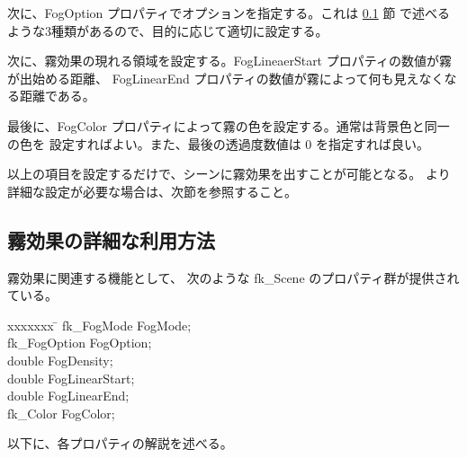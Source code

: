 次に、FogOption プロパティでオプションを指定する。これは \ref{sec:scenefogref} 節
で述べるような3種類があるので、目的に応じて適切に設定する。

次に、霧効果の現れる領域を設定する。FogLineaerStart プロパティの数値が霧が出始める距離、
FogLinearEnd プロパティの数値が霧によって何も見えなくなる距離である。

最後に、FogColor プロパティによって霧の色を設定する。通常は背景色と同一の色を
設定すればよい。また、最後の透過度数値は 0 を指定すれば良い。

以上の項目を設定するだけで、シーンに霧効果を出すことが可能となる。
より詳細な設定が必要な場合は、次節を参照すること。
\subsection{霧効果の詳細な利用方法} \label{sec:scenefogref}
霧効果に関連する機能として、
次のような fk\_Scene のプロパティ群が提供されている。
\begin{bf}
\begin{tabbing}
xxxxxxx \= \kill
\> fk\_FogMode FogMode; \\
\> fk\_FogOption FogOption; \\
\> double FogDensity; \\
\> double FogLinearStart; \\
\> double FogLinearEnd; \\
\> fk\_Color FogColor; \\
\end{tabbing}
\end{bf}
以下に、各プロパティの解説を述べる。
